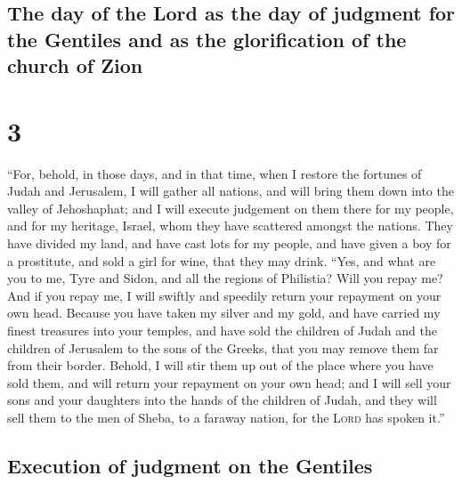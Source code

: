 \hypertarget{the-day-of-the-lord-as-the-day-of-judgment-for-the-gentiles-and-as-the-glorification-of-the-church-of-zion}{%
\subsection{The day of the Lord as the day of judgment for the Gentiles
and as the glorification of the church of
Zion}\label{the-day-of-the-lord-as-the-day-of-judgment-for-the-gentiles-and-as-the-glorification-of-the-church-of-zion}}

\hypertarget{section-2}{%
\section{3}\label{section-2}}

 ``For, behold, in those days, and in that time, when I
restore the fortunes of Judah and Jerusalem,  I will
gather all nations, and will bring them down into the valley of
Jehoshaphat; and I will execute judgement on them there for my people,
and for my heritage, Israel, whom they have scattered amongst the
nations. They have divided my land,  and have cast lots
for my people, and have given a boy for a prostitute, and sold a girl
for wine, that they may drink.  ``Yes, and what are you to
me, Tyre and Sidon, and all the regions of Philistia? Will you repay me?
And if you repay me, I will swiftly and speedily return your repayment
on your own head.  Because you have taken my silver and my
gold, and have carried my finest treasures into your temples,
 and have sold the children of Judah and the children of
Jerusalem to the sons of the Greeks, that you may remove them far from
their border.  Behold, I will stir them up out of the
place where you have sold them, and will return your repayment on your
own head;  and I will sell your sons and your daughters
into the hands of the children of Judah, and they will sell them to the
men of Sheba, to a faraway nation, for the \textsc{Lord} has spoken
it.''

\hypertarget{execution-of-judgment-on-the-gentiles}{%
\subsection{Execution of judgment on the
Gentiles}\label{execution-of-judgment-on-the-gentiles}}

